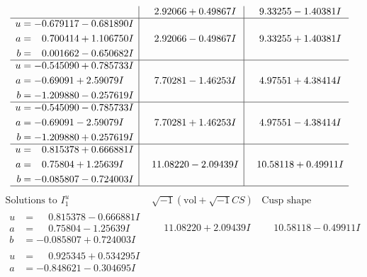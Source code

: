 \documentclass[1p]{elsarticle_modified}
\theoremstyle{definition}
\newcommand{\I}{\sqrt{-1}}
\begin{document}
$$\begin{array}{c|c|c}
 & \phantom{-}2.92066 + 0.49867 I & \phantom{-}9.33255 - 1.40381 I \\ \hline\begin{aligned}
u &= -0.679117 - 0.681890 I \\
a &= \phantom{-}0.700414 + 1.106750 I \\
b &= \phantom{-}0.001662 - 0.650682 I\end{aligned}
 & \phantom{-}2.92066 - 0.49867 I & \phantom{-}9.33255 + 1.40381 I \\ \hline\begin{aligned}
u &= -0.545090 + 0.785733 I \\
a &= -0.69091 + 2.59079 I \\
b &= -1.209880 - 0.257619 I\end{aligned}
 & \phantom{-}7.70281 - 1.46253 I & \phantom{-}4.97551 + 4.38414 I \\ \hline\begin{aligned}
u &= -0.545090 - 0.785733 I \\
a &= -0.69091 - 2.59079 I \\
b &= -1.209880 + 0.257619 I\end{aligned}
 & \phantom{-}7.70281 + 1.46253 I & \phantom{-}4.97551 - 4.38414 I \\ \hline\begin{aligned}
u &= \phantom{-}0.815378 + 0.666881 I \\
a &= \phantom{-}0.75804 + 1.25639 I \\
b &= -0.085807 - 0.724003 I\end{aligned}
 & \phantom{-}11.08220 - 2.09439 I & \phantom{-}10.58118 + 0.49911 I\\
 \hline 
 \end{array}$$\newpage$$\begin{array}{c|c|c}  
\text{Solutions to }I^u_{1}& \I (\text{vol} + \sqrt{-1}CS) & \text{Cusp shape}\\
 \hline 
\begin{aligned}
u &= \phantom{-}0.815378 - 0.666881 I \\
a &= \phantom{-}0.75804 - 1.25639 I \\
b &= -0.085807 + 0.724003 I\end{aligned}
 & \phantom{-}11.08220 + 2.09439 I & \phantom{-}10.58118 - 0.49911 I \\ \hline\begin{aligned}
u &= \phantom{-}0.925345 + 0.534295 I \\
a &= -0.848621 - 0.304695 I \\

\end{aligned}
\end{array}$$
\end{document}
